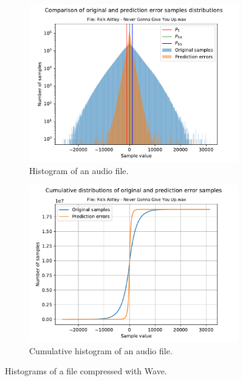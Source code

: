 \begin{figure}[h!]
	\centering
	\begin{subfigure}{0.5\textwidth}
		\centering
		\includegraphics[width=\linewidth]{images/Rick Astley - Never Gonna Give You Up.wav_hist.pdf}
		\caption{Histogram of an audio file.}
		\label{fig:hist_example}
	\end{subfigure}%
	\begin{subfigure}{0.5\textwidth}
		\centering
		\includegraphics[width=\linewidth]{images/Rick Astley - Never Gonna Give You Up.wav_hist_cum.pdf}
		\caption{Cumulative histogram of an audio file.}
		\label{fig:cum_hist_example}
	\end{subfigure}
	\caption{Histograms of a file compressed with Wave.}
	\label{fig:hists_example}
\end{figure}

